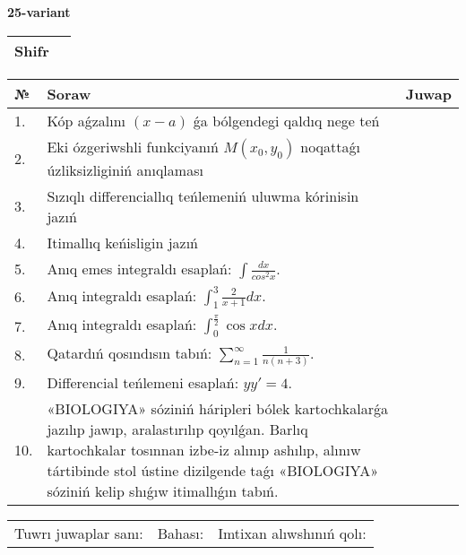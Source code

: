 \documentclass{article}
\begin{document}
  \egroup
  
  \newpage
  
  
  \textbf{25-variant}\\
  
  \bgroup
  \def\arraystretch{1.6} %
  
  \begin{tabular}{|m{5.7cm}|m{9.5cm}|}
  \hline
  Shifr & \\
  \hline
  \end{tabular}
  
  \vspace{1cm}
  
  \begin{tabular}{|m{0.7cm}|m{10cm}|m{4cm}|}
  \hline
  № & Soraw & Juwap \\
  \hline
  1. & Kóp aǵzalını \((x - a)\) ǵa bólgendegi qaldıq nege teń &  \\
  \hline
  2. & Eki ózgeriwshli funkciyanıń \(M(x_{0}, y_{0})\) noqattaǵı úzliksizliginiń anıqlaması &  \\
  \hline
  3. & Sızıqlı differenciallıq teńlemeniń uluwma kórinisin jazıń &  \\
  \hline
  4. & Itimallıq keńisligin jazıń &  \\
  \hline
  5. & Anıq emes integraldı esaplań: \(\int\frac{dx}{cos^2 x}\). &  \\
  \hline
  6. & Anıq integraldı esaplań: \(\int_{1}^{3}\frac{2}{x + 1}dx\). &  \\
  \hline
  7. & Anıq integraldı esaplań: \(\int_{0}^{\frac{\pi}{2}}{\cos xdx}\). &  \\
  \hline
  8. & Qatardıń qosındısın tabıń: \(\sum_{n = 1}^{\infty}\frac{1}{n(n + 3)}\). &  \\
  \hline
  9. & Differencial teńlemeni esaplań: \(yy' = 4\). &  \\
  \hline
  10. & «BIOLOGIYA» sóziniń háripleri bólek kartochkalarǵa jazılıp jawıp, aralastırılıp qoyılǵan. Barlıq kartochkalar tosınnan izbe-iz alınıp ashılıp, alınıw tártibinde stol ústine dizilgende taǵı «BIOLOGIYA» sóziniń kelip shıǵıw itimallıǵın tabıń. &  \\
  \hline
  \end{tabular}
  
  \vspace{1cm}
  
  \begin{tabular}{lll}
  Tuwrı juwaplar sanı: \underline{\hspace{1.5cm}} & 
  Bahası: \underline{\hspace{1.5cm}} & 
  Imtixan alıwshınıń qolı: \underline{\hspace{2cm}} \\
  \end{tabular}
  
\end{document}

